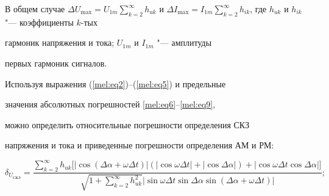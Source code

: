 В общем случае $\Delta U_{\max } =U_{1m} \sum_{k=2}^\infty

h_{uk} $ и $\Delta I_{\max } =I_{1m} \sum_{k=2}^\infty

h_{ik}$, где $h_{uk} $ и $h_{ik} $ "--- коэффициенты $k$-тых

гармоник напряжения и тока; $U_{1m} $ и $I_{1m} $ "--- амплитуды

первых гармоник сигналов.



Используя выражения (\ref{mel:eq2})--(\ref{mel:eq5}) и предельные

значения абсолютных погрешностей \eqref{mel:eq6}--\eqref{mel:eq9},

можно определить относительные погрешности определения СКЗ

напряжения и тока и приведенные погрешности определения АМ и РМ:

\begin{equation}

\label{mel:eq10} \delta _{U_\text{СКЗ} }

=\frac{\sum_{k=2}^\infty h_{uk} \bigl[ \left| \cos ( \Delta

\alpha +\omega \Delta t ) \right|\left( \left| \cos \omega \Delta

t \right|+\left| \cos \Delta \alpha  \right| \right){+}\left| \cos

\omega \Delta t\cos \Delta \alpha \right| \bigr]}{\sqrt

{1+\sum_{k=2}^\infty h_{uk}^2 }  \left| \sin \omega \Delta

t\sin \Delta \alpha \sin \left( \Delta \alpha + \omega \Delta t

\right) \right|};

\end{equation}



\vspace{-5mm}



